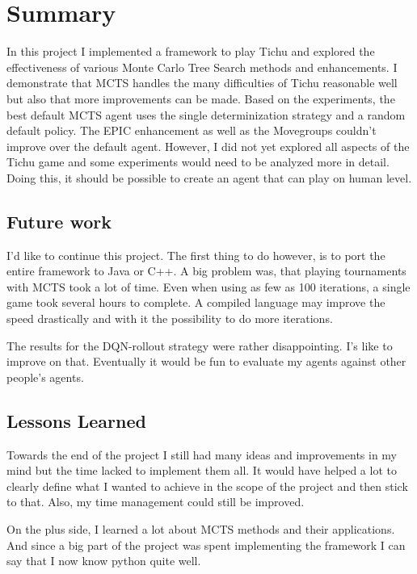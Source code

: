 \chapter{Summary}
In this project I implemented a framework to play Tichu and explored the effectiveness of various Monte Carlo Tree Search methods and enhancements.
I demonstrate that MCTS handles the many difficulties of Tichu reasonable well but also that more improvements can be made.
Based on the experiments, the best default MCTS agent uses the single determinization strategy and a random default policy. The EPIC enhancement as well as the Movegroups couldn't improve over the default agent. However, I did not yet explored all aspects of the Tichu game and some experiments would need to be analyzed more in detail.
Doing this, it should be possible to create an agent that can play on human level.

\section{Future work}
I'd like to continue this project. The first thing to do however, is to port the entire framework to Java or C++. A big problem was, that playing tournaments with MCTS took a lot of time. Even when using as few as 100 iterations, a single game took several hours to complete. A compiled language may improve the speed drastically and with it the possibility to do more iterations.

The results for the DQN-rollout strategy were rather disappointing. I's like to improve on that.
Eventually it would be fun to evaluate my agents against other people's agents.

\section{Lessons Learned}
Towards the end of the project I still had many ideas and improvements in my mind but the time lacked to implement them all. It would have helped a lot to clearly define what I wanted to achieve in the scope of the project and then stick to that. Also, my time management could still be improved.

On the plus side, I learned a lot about MCTS methods and their applications.
And since a big part of the project was spent implementing the framework I can say that I now know python quite well.
